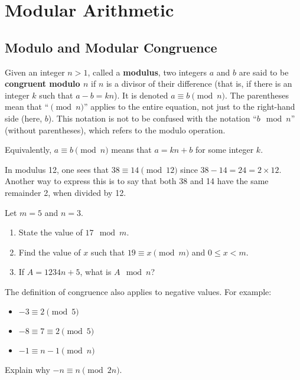 \chapter{Modular Arithmetic}
\section{Modulo and Modular Congruence}

Given an integer $n>1$, called a \textbf{modulus}, two integers $a$ and $b$ are said to be \textbf{congruent modulo $n$} if $n$ is a divisor of their difference (that is, if there is an integer $k$ such that $a - b = kn$). It is denoted $a \equiv b \pmod{n}$. The parentheses mean that ``$\pmod{n}$'' applies to the entire equation, not just to the right-hand side (here, $b$). This notation is not to be confused with the notation ``$b \mod n$'' (without parentheses), which refers to the modulo operation. \begin{remark}
    Equivalently, $a \equiv b \pmod n$ means that $a = kn + b$ for some integer $k$.
\end{remark}
\begin{example}
    In modulus 12, one sees that $38 \equiv 14 \pmod{12}$ since $38 - 14 = 24 = 2 \times 12$. Another way to express this is to say that both 38 and 14 have the same remainder 2, when divided by 12.
\end{example}
\begin{exercise}
    Let $m = 5$ and $n = 3$.
    \begin{enumerate}[label=(\alph*)]
        \item State the value of $17 \mod m$.
        \item Find the value of $x$ such that $19 \equiv x \pmod m$ and $0 \leq x < m$.
        \item If $A = 1234n + 5$, what is $A \mod n$?
    \end{enumerate}
\end{exercise}

The definition of congruence also applies to negative values. For example:
\begin{itemize}
    \item $-3 \equiv 2 \pmod5$
    \item $-8 \equiv 7 \equiv 2 \pmod5$
    \item $-1 \equiv n-1 \pmod{n}$
\end{itemize}

\begin{exercise}
    Explain why $-n \equiv n \pmod{2n}$.
\end{exercise}

